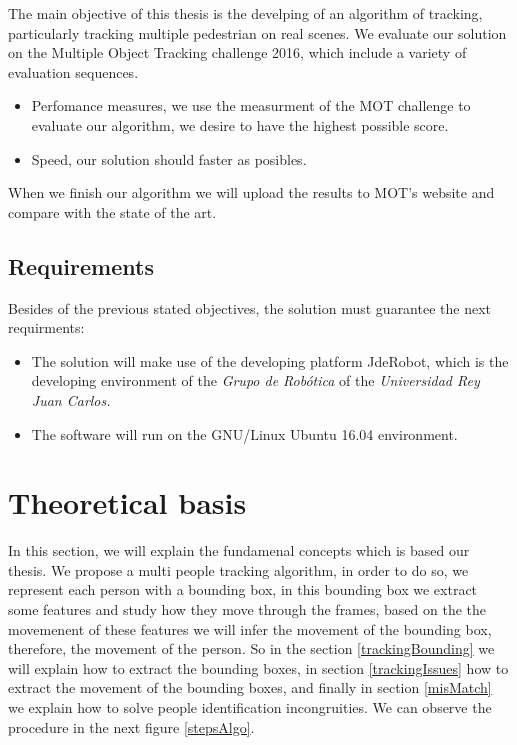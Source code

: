 \documentclass[12pt, a4paper, titlepage,twoside,openright]{article}
\begin{document}
The main objective of this thesis is the develping of an algorithm of tracking, particularly tracking multiple pedestrian on real scenes. We evaluate our solution on the Multiple Object Tracking challenge 2016, which include a variety of evaluation sequences. 

\begin{itemize}

\item Perfomance measures, we use the measurment of the MOT \cite{mot} challenge to evaluate our algorithm, we desire to have the highest possible score. 

\item Speed, our solution should faster as posibles.

\end{itemize}

When we finish our algorithm we will upload the results to MOT's website and compare with the state of the art.

\subsection{Requirements}

Besides of the previous stated objectives, the solution must guarantee the next requirments: 

\begin{itemize}

\item The solution will make use of the developing platform JdeRobot, which is the developing environment of the \textit{Grupo de Robótica} of the \textit{Universidad  Rey Juan Carlos.} 

\item The software will run on the GNU/Linux Ubuntu 16.04 environment.


\end{itemize}





\section{Theoretical basis}\label{TheoriecArch}




In this section, we will explain the fundamenal concepts which is based our thesis. We propose a multi people tracking algorithm, in order to do so, we represent each person with a bounding box, in this bounding box we extract some features and study how they move through the frames, based on the the movemenent of these features we will infer the movement of the bounding box, therefore, the movement of the person. So in the section \ref{trackingBounding} we will explain how to extract the bounding boxes, in section \ref{trackingIssues} how to extract the movement of the bounding boxes, and finally in section \ref{misMatch} we explain how to solve people identification incongruities. We can observe the procedure in the next figure \ref{stepsAlgo}.
\end{document}
